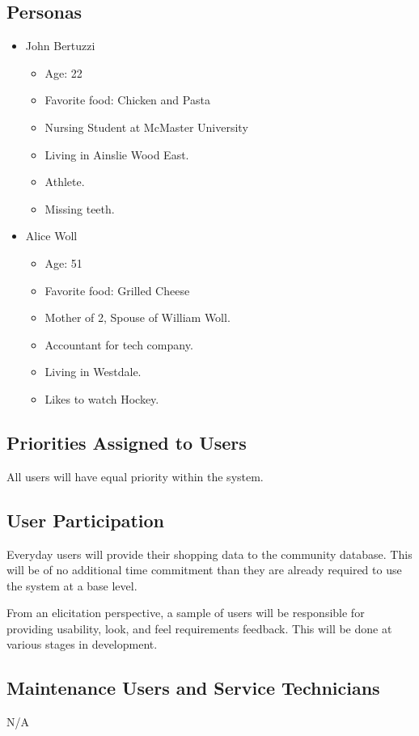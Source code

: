 \documentclass[12pt]{article}
\begin{document}
\subsection{Personas}
\begin{itemize}
  \item John Bertuzzi
  \begin{itemize}
    \item Age: 22
    \item Favorite food: Chicken and Pasta
    \item Nursing Student at McMaster University
    \item Living in Ainslie Wood East.
    \item Athlete.
    \item Missing teeth.
  \end{itemize}
  \item Alice Woll
  \begin{itemize}
    \item Age: 51
    \item Favorite food: Grilled Cheese
    \item Mother of 2, Spouse of William Woll.
    \item Accountant for tech company.
    \item Living in Westdale.
    \item Likes to watch Hockey.
  \end{itemize}
\end{itemize}

\subsection{Priorities Assigned to Users}
All users will have equal priority within the system.

\subsection{User Participation}
Everyday users will provide their shopping data to the community database. This will be of no additional time commitment than they are already required to use the system at a base level.

From an elicitation perspective, a sample of users will be responsible for providing usability, look, and feel requirements feedback. This will be done at various stages in development.
\subsection{Maintenance Users and Service Technicians}
N/A
\end{document}
